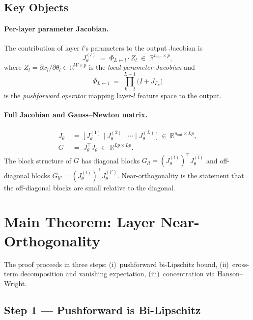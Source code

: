 \documentclass[11pt]{article}
\theoremstyle{plain}
\theoremstyle{definition}
\theoremstyle{remark}
\newcommand{\R}{\mathbb{R}}
\begin{document}
\subsection{Key Objects}

\paragraph{Per-layer parameter Jacobian.}
The contribution of layer $l$'s parameters to the output Jacobian is
\[
  J_\theta^{(l)}
  \;=\;
  \Phi_{L\leftarrow l}\cdot Z_l
  \;\in\;
  \R^{n_{\mathrm{out}}\times p},
\]
where $Z_l = \partial x_l/\partial\theta_l\in\R^{W\times p}$ is the
\emph{local parameter Jacobian} and
\[
  \Phi_{L\leftarrow l}
  \;=\;
  \prod_{k=l}^{L-1}\bigl(I + J_{F_k}\bigr)
\]
is the \emph{pushforward operator} mapping layer-$l$ feature space to the
output.

\paragraph{Full Jacobian and Gauss--Newton matrix.}
\begin{align*}
  J_\theta
  &\;=\;
  \bigl[\,J_\theta^{(1)}\;\big|\;J_\theta^{(2)}\;\big|\;\cdots\;\big|\;
        J_\theta^{(L)}\,\bigr]
  \;\in\;\R^{n_{\mathrm{out}}\times Lp},\\[4pt]
  G
  &\;=\;
  J_\theta^\top J_\theta
  \;\in\;\R^{Lp\times Lp}.
\end{align*}
The block structure of $G$ has diagonal blocks
$G_{ll}=(J_\theta^{(l)})^\top J_\theta^{(l)}$ and off-diagonal blocks
$G_{ll'}=(J_\theta^{(l)})^\top J_\theta^{(l')}$.
Near-orthogonality is the statement that the off-diagonal blocks are small
relative to the diagonal.

\section{Main Theorem: Layer Near-Orthogonality}
\label{sec:main}

The proof proceeds in three steps:
(i)~pushforward bi-Lipschitz bound,
(ii)~cross-term decomposition and vanishing expectation,
(iii)~concentration via Hanson--Wright.

\subsection{Step 1 --- Pushforward is Bi-Lipschitz}
\end{document}
